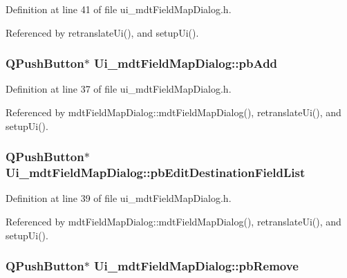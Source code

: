 Definition at line 41 of file ui\-\_\-mdt\-Field\-Map\-Dialog.\-h.



Referenced by retranslate\-Ui(), and setup\-Ui().

\hypertarget{class_ui__mdt_field_map_dialog_a238f1b5debc76c3fff63e7a2b8c543d9}{
\subsubsection[{pb\-Add}]{\setlength{\rightskip}{0pt plus 5cm}Q\-Push\-Button$\ast$ Ui\-\_\-mdt\-Field\-Map\-Dialog\-::pb\-Add}}\label{class_ui__mdt_field_map_dialog_a238f1b5debc76c3fff63e7a2b8c543d9}


Definition at line 37 of file ui\-\_\-mdt\-Field\-Map\-Dialog.\-h.



Referenced by mdt\-Field\-Map\-Dialog\-::mdt\-Field\-Map\-Dialog(), retranslate\-Ui(), and setup\-Ui().

\hypertarget{class_ui__mdt_field_map_dialog_aff6b12a8a09b3381c7910ed0d7a8e73b}{
\subsubsection[{pb\-Edit\-Destination\-Field\-List}]{\setlength{\rightskip}{0pt plus 5cm}Q\-Push\-Button$\ast$ Ui\-\_\-mdt\-Field\-Map\-Dialog\-::pb\-Edit\-Destination\-Field\-List}}\label{class_ui__mdt_field_map_dialog_aff6b12a8a09b3381c7910ed0d7a8e73b}


Definition at line 39 of file ui\-\_\-mdt\-Field\-Map\-Dialog.\-h.



Referenced by mdt\-Field\-Map\-Dialog\-::mdt\-Field\-Map\-Dialog(), retranslate\-Ui(), and setup\-Ui().

\hypertarget{class_ui__mdt_field_map_dialog_a174e6dabe905ab4d0b45a24fd408ad20}{
\subsubsection[{pb\-Remove}]{\setlength{\rightskip}{0pt plus 5cm}Q\-Push\-Button$\ast$ Ui\-\_\-mdt\-Field\-Map\-Dialog\-::pb\-Remove}}\label{class_ui__mdt_field_map_dialog_a174e6dabe905ab4d0b45a24fd408ad20}


